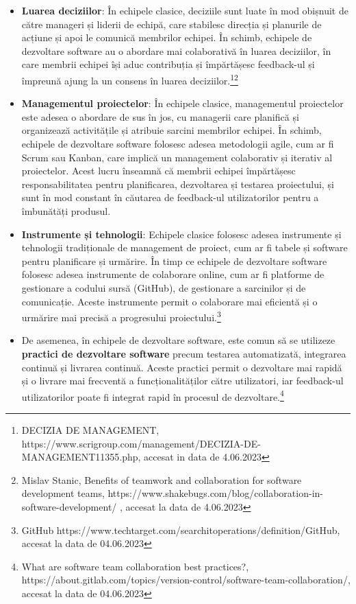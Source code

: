 \documentclass[a4paper, 12pt]{article}
\begin{document}
\begin {itemize}

	\item \textbf{Luarea deciziilor}: În echipele clasice, deciziile sunt luate în mod obișnuit de către manageri și liderii de echipă, care stabilesc direcția și planurile de acțiune și apoi le comunică membrilor echipei. În schimb, echipele de dezvoltare software au o abordare mai colaborativă în luarea deciziilor, în care membrii echipei își aduc contribuția și împărtășesc feedback-ul și împreună ajung la un consens în luarea deciziilor.\footnote{DECIZIA DE MANAGEMENT, https://www.scrigroup.com/management/DECIZIA-DE-MANAGEMENT11355.php, accesat in data de 4.06.2023}\footnote{Mislav Stanic, Benefits of teamwork and collaboration for software development teams, https://www.shakebugs.com/blog/collaboration-in-software-development/ , accesat la data de 4.06.2023}

	\item\textbf{Managementul proiectelor}: În echipele clasice, managementul proiectelor este adesea o abordare de sus în jos, cu managerii care planifică și organizează activitățile și atribuie sarcini membrilor echipei. În schimb, echipele de dezvoltare software folosesc adesea metodologii agile, cum ar fi Scrum sau Kanban, care implică un management colaborativ și iterativ al proiectelor. Acest lucru înseamnă că membrii echipei împărtășesc responsabilitatea pentru planificarea, dezvoltarea și testarea proiectului, și sunt în mod constant în căutarea de feedback-ul utilizatorilor pentru a îmbunătăți produsul.

	\item \textbf{ Instrumente și tehnologii}: Echipele clasice folosesc adesea instrumente și tehnologii tradiționale de management de proiect, cum ar fi tabele și software pentru planificare și urmărire. În timp ce echipele de dezvoltare software folosesc adesea instrumente de colaborare online, cum ar fi platforme de gestionare a codului sursă (GitHub), de gestionare a sarcinilor și de comunicație. Aceste instrumente permit o colaborare mai eficientă și o urmărire mai precisă a progresului proiectului.\footnote{GitHub
https://www.techtarget.com/searchitoperations/definition/GitHub, accesat la data de 04.06.2023}

	\item De asemenea, în echipele de dezvoltare software, este comun să se utilizeze \textbf{practici de dezvoltare software} precum testarea automatizată, integrarea continuă și livrarea continuă. Aceste practici permit o dezvoltare mai rapidă și o livrare mai frecventă a funcționalităților către utilizatori, iar feedback-ul utilizatorilor poate fi integrat rapid în procesul de dezvoltare.\footnote{What are software team collaboration best practices?, https://about.gitlab.com/topics/version-control/software-team-collaboration/, accesat la data de 04.06.2023}


\end{itemize}
\end{document}
